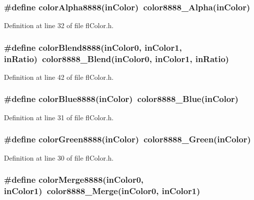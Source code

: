 \subsubsection{\setlength{\rightskip}{0pt plus 5cm}\#define color\-Alpha8888(in\-Color)~color8888\_\-Alpha(in\-Color)}\label{flColor_8h_67f30158f5d9f7d602e5e8c0f45db7fb}




Definition at line 32 of file fl\-Color.h.
\subsubsection{\setlength{\rightskip}{0pt plus 5cm}\#define color\-Blend8888(in\-Color0, in\-Color1, in\-Ratio)~color8888\_\-Blend(in\-Color0, in\-Color1, in\-Ratio)}\label{flColor_8h_3d5ee582ac6f2a3e51d1c1296a929f5a}




Definition at line 42 of file fl\-Color.h.
\subsubsection{\setlength{\rightskip}{0pt plus 5cm}\#define color\-Blue8888(in\-Color)~color8888\_\-Blue(in\-Color)}\label{flColor_8h_dace7342dfc64ba7d1249b951f5fc507}




Definition at line 31 of file fl\-Color.h.
\subsubsection{\setlength{\rightskip}{0pt plus 5cm}\#define color\-Green8888(in\-Color)~color8888\_\-Green(in\-Color)}\label{flColor_8h_a09744e0115d834931e50490372f475a}




Definition at line 30 of file fl\-Color.h.
\subsubsection{\setlength{\rightskip}{0pt plus 5cm}\#define color\-Merge8888(in\-Color0, in\-Color1)~color8888\_\-Merge(in\-Color0, in\-Color1)}\label{flColor_8h_3341f8a7676f477ed9f5d397b4ea350a}




